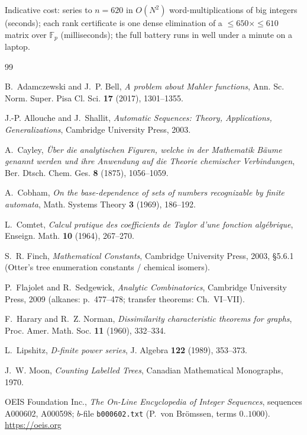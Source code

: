 \documentclass[11pt]{article}
\theoremstyle{definition}
\newcommand{\FF}{\mathbb{F}}
\begin{document}
Indicative cost: series to $n=620$ in $O(N^2)$ word-multiplications of big
integers (seconds); each rank certificate is one dense elimination of a
$\le650\times\le610$ matrix over $\FF_p$ (milliseconds); the full battery runs
in well under a minute on a laptop.

\begin{thebibliography}{99}

B.~Adamczewski and J.~P. Bell,
\emph{A problem about Mahler functions},
Ann. Sc. Norm. Super. Pisa Cl. Sci. \textbf{17} (2017), 1301--1355.

J.-P. Allouche and J.~Shallit,
\emph{Automatic Sequences: Theory, Applications, Generalizations},
Cambridge University Press, 2003.

A.~Cayley,
\emph{\"Uber die analytischen Figuren, welche in der Mathematik B\"aume genannt
werden und ihre Anwendung auf die Theorie chemischer Verbindungen},
Ber. Dtsch. Chem. Ges. \textbf{8} (1875), 1056--1059.

A.~Cobham,
\emph{On the base-dependence of sets of numbers recognizable by finite
automata}, Math. Systems Theory \textbf{3} (1969), 186--192.

L.~Comtet,
\emph{Calcul pratique des coefficients de Taylor d'une fonction alg\'ebrique},
Enseign. Math. \textbf{10} (1964), 267--270.

S.~R. Finch,
\emph{Mathematical Constants},
Cambridge University Press, 2003, \S5.6.1 (Otter's tree enumeration constants /
chemical isomers).

P.~Flajolet and R.~Sedgewick,
\emph{Analytic Combinatorics},
Cambridge University Press, 2009 (alkanes: p.~477--478; transfer theorems:
Ch.~VI--VII).

F.~Harary and R.~Z. Norman,
\emph{Dissimilarity characteristic theorems for graphs},
Proc. Amer. Math. Soc. \textbf{11} (1960), 332--334.

L.~Lipshitz,
\emph{D-finite power series},
J. Algebra \textbf{122} (1989), 353--373.

J.~W. Moon,
\emph{Counting Labelled Trees},
Canadian Mathematical Monographs, 1970.

OEIS Foundation Inc.,
\emph{The On-Line Encyclopedia of Integer Sequences},
sequences A000602, A000598; $b$-file \texttt{b000602.txt} (P.~von Br\"omssen,
terms $0..1000$). \url{https://oeis.org}


\end{thebibliography}
\end{document}
